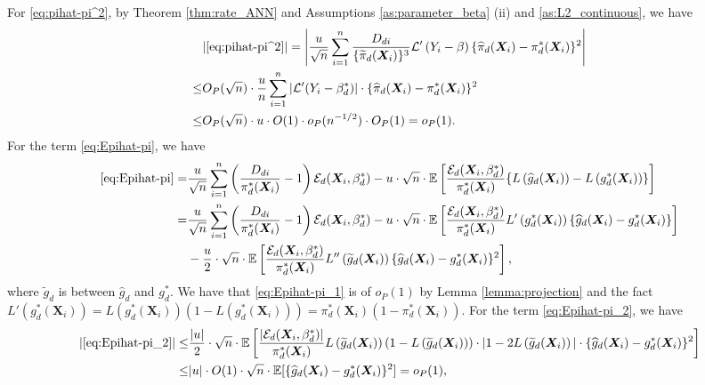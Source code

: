 \documentclass[11pt]{article}
\numberwithin{equation}{section}
\begin{document}
For \eqref{eq:pihat-pi^2}, by Theorem \ref{thm:rate_ANN} and Assumptions \ref{as:parameter_beta} (ii) and \ref{as:L2_continuous}, we have
\begin{align}
	&|\eqref{eq:pihat-pi^2}|=\left|\frac{u}{\sqrt{n}}\sum_{i=1}^n\frac{D_{di}}{\{\widetilde{\pi}_d(\boldsymbol{X}_{i})\}^3}\mathcal{L}'\left(Y_i-{\beta}\right)\{\widehat{\pi}_d(\boldsymbol{X}_{i})-\pi_d^*(\boldsymbol{X}_{i}) \}^2\right| \notag\\
	\leq& O_P(\sqrt{n})\cdot\frac{u}{n}\sum_{i=1}^n|\mathcal{L}'(Y_i-{\beta}^*_d)|\cdot \{\widehat{\pi}_d(\boldsymbol{X}_{i})-{\pi}^*_d(\boldsymbol{X}_{i})\}^2 \notag\\
	\leq&O_P(\sqrt{n})\cdot u\cdot O(1)\cdot o_P(n^{-1/2})\cdot O_P(1)=o_P(1). \notag
\end{align}
For the term \eqref{eq:Epihat-pi}, we have
\begin{align}
	\eqref{eq:Epihat-pi}=&\frac{u}{\sqrt{n}}\sum_{i=1}^n\left(\frac{D_{di}}{\pi_d^*(\boldsymbol{X}_{i})}-1\right)\mathcal{E}_{d}(\boldsymbol{X}_{i},\beta_d^*)-u\cdot\sqrt{n}\cdot\mathbb{E}\left[\frac{\mathcal{E}_{d}(\boldsymbol{X}_{i},\beta_d^*)}{{\pi}^*_d(\boldsymbol{X}_{i})}\{L\left(\widehat{g}_d(\boldsymbol{X}_{i})\right)-L\left(g_d^*(\boldsymbol{X}_{i})\right) \}\right]\notag\\
	=& \frac{u}{\sqrt{n}}\sum_{i=1}^n\left(\frac{D_{di}}{\pi_d^*(\boldsymbol{X}_{i})}-1\right)\mathcal{E}_{d}(\boldsymbol{X}_{i},\beta_d^*)-u\cdot\sqrt{n}\cdot\mathbb{E}\left[\frac{\mathcal{E}_{d}(\boldsymbol{X}_{i},\beta_d^*)}{{\pi}^*_d(\boldsymbol{X}_{i})}L'\left(g_d^*(\boldsymbol{X}_{i})\right)\{\widehat{g}_d(\boldsymbol{X}_{i})-g_d^*(\boldsymbol{X}_{i})\}\right]\label{eq:Epihat-pi_1}\\
	&-\frac{u}{2}\cdot\sqrt{n}\cdot\mathbb{E}\left[\frac{\mathcal{E}_{d}(\boldsymbol{X}_{i},\beta_d^*)}{{\pi}^*_d(\boldsymbol{X}_{i})}L''\left(\widetilde{g}_d(\boldsymbol{X}_{i})\right)\{\widehat{g}_d(\boldsymbol{X}_{i})-g_d^*(\boldsymbol{X}_{i})\}^2\right],\label{eq:Epihat-pi_2}
\end{align}
where $\widetilde{g}_d$ is between $\widehat{g}_d$ and ${g}^*_d$.  We have that \eqref{eq:Epihat-pi_1} is of $o_P(1)$ by Lemma \ref{lemma:projection} and the fact $L'\left(g_d^*(\boldsymbol{X}_{i})\right)=L\left(g_d^*(\boldsymbol{X}_{i})\right)(1-L\left(g_d^*(\boldsymbol{X}_{i})\right))=\pi_d^*(\boldsymbol{X}_i)(1-\pi_d^*(\boldsymbol{X}_i))$.  For the term \eqref{eq:Epihat-pi_2}, we have
\begin{align*}
	|\eqref{eq:Epihat-pi_2}|\leq& \frac{|u|}{2}\cdot\sqrt{n}\cdot\mathbb{E}\left[\frac{|\mathcal{E}_{d}(\boldsymbol{X}_{i},\beta_d^*)|}{{\pi}^*_d(\boldsymbol{X}_{i})}L\left(\widetilde{g}_d(\boldsymbol{X}_{i})\right)(1-L\left(\widetilde{g}_d(\boldsymbol{X}_{i})\right))\cdot|1-2L\left(\widetilde{g}_d(\boldsymbol{X}_{i})\right)|\cdot\{\widehat{g}_d(\boldsymbol{X}_{i})-g_d^*(\boldsymbol{X}_{i})\}^2\right]\\
	\leq&|u|\cdot O(1)\cdot \sqrt{n}\cdot \mathbb{E}[\{\widehat{g}_d(\boldsymbol{X}_{i})-g_d^*(\boldsymbol{X}_{i})\}^2]=o_P(1),
\end{align*}
\end{document}
